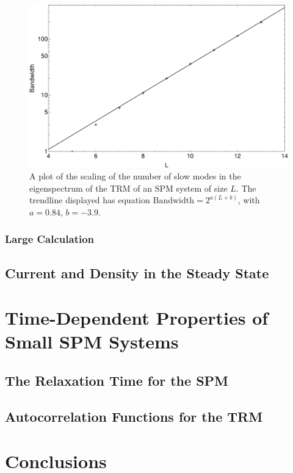  \begin{figure}[h!]
 \caption[A graph of the scaling of the number of slow modes with system size.]{\label{fig:bandWidthScaling} 
 A plot of the scaling of the number of slow modes in the eigenspectrum of the TRM of
 an SPM system of size $L$. The trendline displayed has equation
 $ \mathrm{Bandwidth} = 2^{a(L+b)}$, with $a=0.84$, $b=-3.9$.
 }
  \begin{center}
 \includegraphics[width=1.0\textwidth]{TRM/images/bandWidth}
  \end{center}
\end{figure}

\subsubsection{Large Calculation}

\subsection{Current and Density in the Steady State}

\section{Time-Dependent Properties of Small SPM Systems}

\subsection{The Relaxation Time for the SPM}

\subsection{Autocorrelation Functions for the TRM}

\section{Conclusions}
